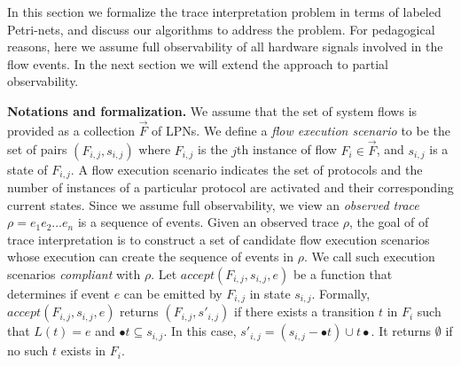 \documentclass[conference]{IEEEtran}
\begin{document}
In this section we formalize the trace interpretation
problem in terms of labeled Petri-nets, and discuss our
algorithms to address the problem.  For pedagogical reasons,
here we assume full observability of all hardware signals
involved in the flow events.  In the next section we will
extend the approach to partial observability.

\medskip

\noindent 
{\bf Notations and formalization.}  We assume that the set
of system flows is provided as a collection ${\vec{F}}$ of
LPNs.  We define a {\em flow execution scenario} to be the
set of pairs $(F_{i,j}, s_{i,j})$ where $F_{i,j}$ is the
$j$th instance of flow $F_i \in {\vec{F}}$, and $s_{i,j}$ is
a state of $F_{i,j}$.  A flow execution scenario indicates
the set of protocols and the number of instances of a
particular protocol are activated and their corresponding
current states.  Since we assume full observability, we view
an {\em observed trace} $\rho = e_1e_2\ldots e_n$ is a
sequence of events.  Given an observed trace $\rho$, the
goal of of trace interpretation is to construct a set of
candidate flow execution scenarios whose execution can
create the sequence of events in $\rho$.  We call such
execution scenarios {\em compliant} with $\rho$.  Let
$\mathit{accept(F_{i,j}, s_{i,j}, e)}$ be a function that
determines if event $e$ can be emitted by $F_{i,j}$ in state
$s_{i,j}$.  Formally, $\mathit{accept(F_{i,j}, s_{i,j}, e)}$
returns $(F_{i,j}, s'_{i,j})$ if there exists a transition
$t$ in $F_i$ such that $L(t) = e$ and $\bullet t \subseteq
s_{i,j}$.  In this case, $s'_{i,j} = (s_{i,j} - \bullet t)
\cup t\bullet$.  It returns $\emptyset$ if no such $t$
exists in $F_i$.

\medskip
\end{document}
